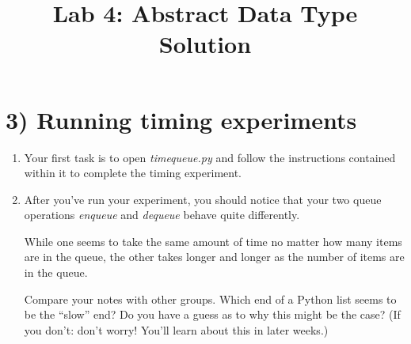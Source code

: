 \documentclass[12pt]{article}
\begin{document}
\title{Lab 4: Abstract Data Type Solution}
\date{}
\maketitle

\section*{3) Running timing experiments}
\begin{enumerate}[1.]
    \item Your first task is to open \textit{timequeue.py} and follow the instructions
    contained within it to complete the timing experiment.

    \item After you’ve run your experiment, you should notice that your two queue
    operations \textit{enqueue} and \textit{dequeue} behave quite differently.

    \bigskip

    While one seems to take the same amount of time no matter how many items are
    in the queue, the other takes longer and longer as the number of items are in
    the queue.

    \bigskip

    Compare your notes with other groups.
    Which end of a Python list seems to be the “slow” end? Do you have a guess
    as to why this might be the case? (If you don't: don't worry! You'll learn
    about this in later weeks.)

\end{enumerate}
\end{document}
